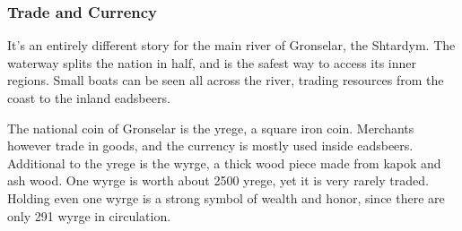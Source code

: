\begin{linenumbers}
\subsubsection{Trade and Currency}

It's an entirely different story for the main river of Gronselar, the Shtardym.
The waterway splits the nation in half, and is the safest way to access its inner regions.
Small boats can be seen all across the river, trading resources from the coast to the inland eadsbeers.

The national coin of Gronselar is the yrege, a square iron coin.
Merchants however trade in goods, and the currency is mostly used inside eadsbeers.
Additional to the yrege is the wyrge, a thick wood piece made from kapok and ash wood.
One wyrge is worth about 2500 yrege, yet it is very rarely traded.
Holding even one wyrge is a strong symbol of wealth and honor, since there are only 291 wyrge in circulation.





\end{linenumbers}
